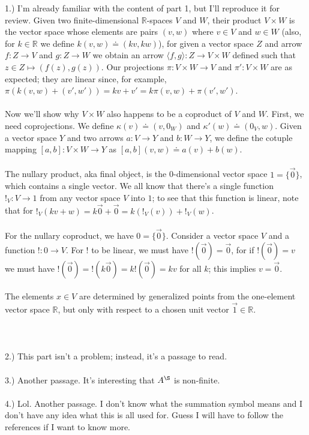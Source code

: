 \documentclass{article}
\begin{document}
1.) I'm already familiar with the content of part 1, but I'll reproduce it for review.
Given two finite-dimensional $\mathbb R$-spaces $V$ and $W$, their product $V \times W$ 
is the vector space whose elements are pairs $(v,w)$ where $v \in V$ and $w \in W$ (also, for $k \in \mathbb R$ we define 
$k(v,w) \doteq (kv,kw)$),
for given a vector space $Z$ and arrow $f : Z \to V$ and $g : Z \to W$ we obtain an 
arrow $\langle f,g \rangle : Z \to V \times W$ defined such that $z \in Z \mapsto (f(z),g(z))$.
Our projections $\pi : V \times W \to V$ and $\pi' : V \times W$ are as expected;
they are linear since, for example, $\pi(k(v,w) + (v',w')) = kv + v' = k\pi(v,w) + \pi(v',w')$.
\\~\\
Now we'll show why $V \times W$ also happens to be a coproduct of $V$ and $W$. First, we need
coprojections. We define $\kappa (v) \doteq (v,0_W)$ and $\kappa'(w) \doteq (0_V,w)$.
Given a vector space $Y$ and two arrows $a : V \to Y$ and $b : W \to Y$, we define the 
cotuple mapping $[a,b] : V \times W \to Y$ as $[a,b](v,w) \doteq a(v) + b(w)$.
\\~\\
The nullary product, aka final object, is the 0-dimensional vector space $1 = \{ \vec{0} \}$, which contains a single vector.
We all know that there's a single function $!_V : V \to 1$ from any vector space $V$ into 
$1$; to see that this function is linear, note that for $!_V(kv + w) = k\vec{0} + \vec{0} = k(!_V(v)) + !_V(w)$.
\\~\\
For the nullary coproduct, we have $0 = \{ \vec{0} \}$. Consider a vector space $V$ and a function $! : 0 \to V$.
For $!$ to be linear, we must have $!(\vec{0}) = \vec{0}$, for if $!(\vec{0}) = v$ we must have 
$!(\vec{0}) = !(k \vec{0}) = k!(\vec{0}) = kv$ for all $k$; this implies $v = \vec{0}$.
\\~\\
The elements $x \in V$ are determined by generalized points from the one-element vector space $\mathbb R$,
but only with respect to a chosen unit vector $\vec{1} \in \mathbb R$.
\\~\\~\\~\\
2.) This part isn't a problem; instead, it's a passage to read.
\\~\\
3.) Another passage. It's interesting that $A^{\S}$ is non-finite.
\\~\\
4.) Lol. Another passage. I don't know what the summation symbol means and I don't have any idea what this is all
used for. Guess I will have to follow the references if I want to know more.
\end{document}
